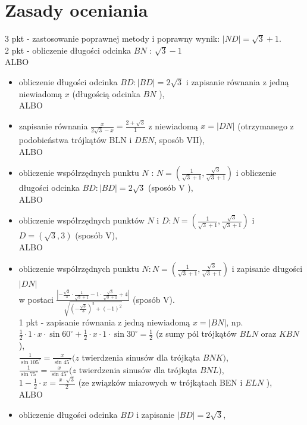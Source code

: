 \documentclass[10pt]{article}
\begin{document}
\section*{Zasady oceniania}
3 pkt - zastosowanie poprawnej metody i poprawny wynik: $|N D|=\sqrt{3}+1$.\\
2 pkt - obliczenie długości odcinka $B N$ : $\sqrt{3}-1$\\
ALBO

\begin{itemize}
  \item obliczenie długości odcinka $B D:|B D|=2 \sqrt{3}$ i zapisanie równania z jedną niewiadomą $x$ (długością odcinka $B N$ ),\\
ALBO
  \item zapisanie równania $\frac{x}{2 \sqrt{3}-x}=\frac{2+\sqrt{3}}{1}$ z niewiadomą $x=|D N|$ (otrzymanego z podobieństwa trójkątów BLN i $D E N$, sposób VII),\\
ALBO
  \item obliczenie współrzędnych punktu $N$ : $N=\left(\frac{1}{\sqrt{3}+1}, \frac{\sqrt{3}}{\sqrt{3}+1}\right)$ i obliczenie długości odcinka $B D:|B D|=2 \sqrt{3}$ (sposób V ),\\
ALBO
  \item obliczenie współrzędnych punktów $N$ i $D: N=\left(\frac{1}{\sqrt{3}+1}, \frac{\sqrt{3}}{\sqrt{3}+1}\right)$ i $D=(\sqrt{3}, 3)$ (sposób V),\\
ALBO
  \item obliczenie współrzędnych punktu $N: N=\left(\frac{1}{\sqrt{3}+1}, \frac{\sqrt{3}}{\sqrt{3}+1}\right)$ i zapisanie długości $|D N|$\\
w postaci $\frac{\left|-\frac{\sqrt{3}}{3} \cdot \frac{1}{\sqrt{3}+1}-1 \cdot \frac{\sqrt{3}}{\sqrt{3}+1}+4\right|}{\sqrt{\left(-\frac{\sqrt{3}}{3}\right)^{2}+(-1)^{2}}}$ (sposób V).\\
1 pkt - zapisanie równania z jedną niewiadomą $x=|B N|$, np.\\
$\frac{1}{2} \cdot 1 \cdot x \cdot \sin 60^{\circ}+\frac{1}{2} \cdot x \cdot 1 \cdot \sin 30^{\circ}=\frac{1}{2}$ (z sumy pól trójkątów $B L N$ oraz $K B N$ ),\\
$\frac{1}{\sin 105^{\circ}}=\frac{x}{\sin 45^{\circ}}(z$ twierdzenia sinusów dla trójkąta $B N K)$,\\
$\frac{1}{\sin 75^{\circ}}=\frac{x}{\sin 45^{\circ}}(z$ twierdzenia sinusów dla trójkąta $B N L)$,\\
$1-\frac{1}{2} \cdot x=\frac{x \cdot \sqrt{3}}{2}$ (ze związków miarowych w trójkątach BEN i $E L N$ ),\\
ALBO
  \item obliczenie długości odcinka $B D$ i zapisanie $|B D|=2 \sqrt{3}$,
\end{itemize}
\end{document}

